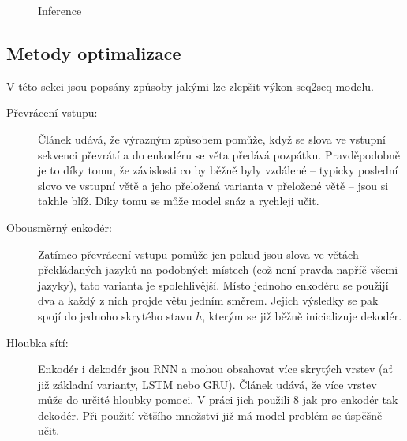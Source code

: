 \begin{figure}[H]
    \begin{center}
    \end{center}
	\caption{Inference}
	\label{img:inference}
\end{figure}



\subsection{Metody optimalizace} \label{subsection:optimization} V této sekci jsou popsány způsoby jakými lze zlepšit výkon seq2seq modelu.

\begin{description}
  \item[Převrácení vstupu:] \label{desc:revert} Článek \cite{seq2seq} udává, že výrazným způsobem pomůže, když se slova ve vstupní sekvenci převrátí a do enkodéru  se věta předává pozpátku. Pravděpodobně je to díky tomu, že závislosti co by běžně byly vzdálené -- typicky poslední slovo ve vstupní větě a jeho přeložená varianta v přeložené větě -- jsou si takhle blíž. Díky tomu se může model snáz a rychleji učit.
  \item[Obousměrný enkodér:] Zatímco převrácení vstupu pomůže jen pokud jsou slova ve větách překládaných jazyků na podobných místech (což není pravda napříč všemi jazyky), tato varianta je spolehlivější. Místo jednoho enkodéru se použijí dva a každý z nich projde větu jedním směrem. Jejich výsledky se pak spojí do jednoho skrytého stavu $h$, kterým se již běžně inicializuje dekodér.
  \item[Hloubka sítí:] Enkodér i dekodér jsou RNN a mohou obsahovat více skrytých vrstev (ať již základní varianty, LSTM nebo GRU). Článek \cite{googleBridgingGap} udává, že více vrstev může do určité hloubky pomoci. V práci jich použili 8 jak pro enkodér tak dekodér. Při použití většího množství již má model problém se úspěšně učit.
\end{description}

